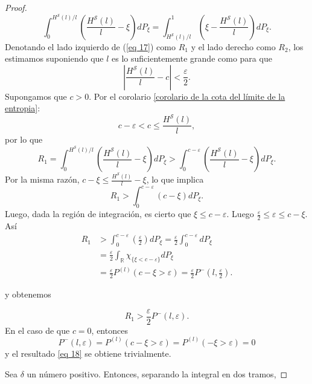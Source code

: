 \documentclass{report}
\begin{document}
\begin{proof}
    \begin{equation}\label{eq 17}
    \int_{0}^{H^{\mathcal{S}}(l)/l} \left( \frac{H^{\mathcal{S}}(l)}{l} - \xi \right) dP_{\xi} =
    \int_{H^{\mathcal{S}}(l)/l}^{1} \left( \xi - \frac{H^{\mathcal{S}}(l)}{l} \right) dP_{\xi}.
    \end{equation}
    Denotando el lado izquierdo de (\ref{eq 17}) como \( R_1 \) y el lado derecho como \( R_2 \),
    los estimamos suponiendo que \( l \) es lo suficientemente grande como para que
    \[
    \left| \frac{H^{\mathcal{S}}(l)}{l} - c \right| < \frac{\varepsilon}{2}.
    \]
    Supongamos que $c>0$. Por el corolario \ref{corolario de la cota del límite de la entropia}:
    \[
        c-\varepsilon < c \leq \frac{H^{\mathcal{S}}(l)}{l},
    \]
    por lo que
    \[
        R_1 = \int_{0}^{H^{\mathcal{S}}(l)/l} \left( \frac{H^{\mathcal{S}}(l)}{l} - \xi \right) dP_{\xi}
        > \int_{0}^{c-\varepsilon} \left( \frac{H^{\mathcal{S}}(l)}{l} - \xi \right) dP_{\xi}.
    \]
    Por la misma razón, $c-\xi \leq  \frac{H^{\mathcal{S}}(l)}{l} - \xi$, lo que implica
    \[
        R_1 > \int_{0}^{c-\varepsilon} \left( c - \xi \right) dP_{\xi}.
    \]
    Luego, dada la región de integración, es cierto que $\xi \leq c-\varepsilon$. Luego $\frac{\varepsilon}{2} \leq \varepsilon \leq c-\xi$. Así
    \begin{equation*}
    \begin{aligned}
        R_1 &> \int_{0}^{c-\varepsilon} \left( \frac{\varepsilon}{2}  \right) dP_{\xi} = \frac{\varepsilon}{2} \int_{0}^{c-\varepsilon}dP_{\xi} \\
        &= \frac{\varepsilon}{2} \int_{\mathbb{R}} \chi_{\{\xi< c-\varepsilon\}} dP_{\xi} \\
        &= \frac{\varepsilon}{2} P^{(l)}(c-\xi>\varepsilon)
        = \frac{\varepsilon}{2} P^-\left(l,\frac{\varepsilon}{2}\right).
    \end{aligned}
    \end{equation*}

    y obtenemos

    \begin{equation}\label{eq 18}
    R_1 > \frac{\varepsilon}{2} P^-(l, \varepsilon).
    \end{equation}
    En el caso de que $c=0$, entonces
    \[P^-(l, \varepsilon)= P^{(l)}(c - \xi > \varepsilon) = P^{(l)}(-\xi > \varepsilon) = 0\]
    y el resultado \ref{eq 18}
    se obtiene trivialmente.

    \bigskip

    Sea \( \delta \) un número positivo. Entonces, separando la integral en dos tramos,


\end{proof}
\end{document}
